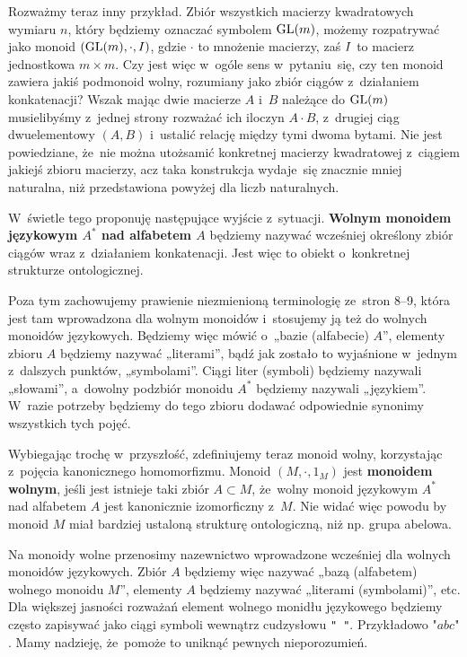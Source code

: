 \documentclass[a4paper,11pt]{article}
\begin{document}
Rozważmy teraz inny przykład. Zbiór wszystkich macierzy kwadratowych
wymiaru $n$, który będziemy oznaczać symbolem $\mathrm{GL}( m )$, możemy
rozpatrywać jako monoid $( \mathrm{GL}( m ), \cdot, I )$, gdzie $\cdot$
to mnożenie macierzy, zaś $I$ to macierz jednostkowa
$m \times m$. Czy jest więc w~ogóle sens w~pytaniu~się, czy
ten monoid zawiera jakiś podmonoid wolny, rozumiany jako zbiór ciągów
z~działaniem konkatenacji? Wszak mając dwie macierze $A$ i~$B$
należące do $\mathrm{GL}( m )$ musielibyśmy z~jednej strony rozważać ich
iloczyn $A \cdot B$, z~drugiej ciąg dwuelementowy $( A, B )$ i~ustalić
relację między tymi dwoma bytami. Nie jest powiedziane, że~nie można
utożsamić konkretnej macierzy kwadratowej z~ciągiem jakiejś zbioru
macierzy, acz taka konstrukcja wydaje~się znacznie mniej naturalna,
niż przedstawiona powyżej dla liczb naturalnych.

W~świetle tego proponuję następujące wyjście z~sytuacji.
\textbf{Wolnym monoidem językowym $A^{ * }$ nad alfabetem $A$}
będziemy nazywać wcześniej określony zbiór ciągów wraz z~działaniem
konkatenacji. Jest więc to obiekt o~konkretnej strukturze
ontologicznej.

Poza tym zachowujemy prawienie niezmienioną terminologię ze~stron 8--9,
która jest tam wprowadzona dla wolnym monoidów i~stosujemy ją też do
wolnych monoidów językowych. Będziemy więc mówić o~„bazie (alfabecie) $A$”,
elementy zbioru $A$ będziemy nazywać „literami”, bądź jak zostało to
wyjaśnione w~jednym z~dalszych punktów, „symbolami”. Ciągi liter (symboli)
będziemy nazywali „słowami”, a~dowolny podzbiór monoidu $A^{ * }$ będziemy
nazywali „językiem”. W~razie potrzeby będziemy do tego zbioru dodawać
odpowiednie synonimy wszystkich tych pojęć.

Wybiegając trochę w~przyszłość, zdefiniujemy teraz monoid wolny, korzystając
z~pojęcia kanonicznego homomorfizmu. Monoid $( M, \cdot, 1_{ M } )$ jest
\textbf{monoidem wolnym}, jeśli jest istnieje taki zbiór $A \subset M$, że~wolny
monoid językowym $A^{ * }$ nad alfabetem $A$ jest kanonicznie izomorficzny
z~$M$. Nie widać więc powodu by monoid $M$ miał bardziej ustaloną strukturę
ontologiczną, niż np. grupa abelowa.

Na monoidy wolne przenosimy nazewnictwo wprowadzone wcześniej dla wolnych
monoidów językowych. Zbiór $A$ będziemy więc nazywać „bazą (alfabetem)
wolnego monoidu $M$”, elementy $A$ będziemy nazywać „literami (symbolami)”,
etc. Dla większej jasności rozważań element wolnego monidłu językowego
będziemy często zapisywać jako ciągi symboli wewnątrz cudzysłowu
\texttt{" "}. Przykładowo $\texttt{"} abc \texttt{"}$. Mamy nadzieję,
że~pomoże to uniknąć pewnych nieporozumień.
\end{document}
